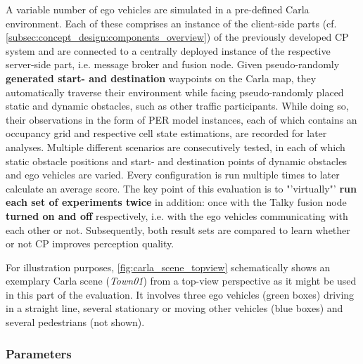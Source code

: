 A variable number of ego vehicles are simulated in a pre-defined Carla environment. Each of these comprises an instance of the client-side parts (cf. \cref{subsec:concept_design:components_overview}) of the previously developed CP system and are connected to a centrally deployed instance of the respective server-side part, i.e. message broker and fusion node. Given pseudo-randomly \textbf{generated start- and destination} waypoints on the Carla map, they automatically traverse their environment while facing pseudo-randomly placed static and dynamic obstacles, such as other traffic participants. While doing so, their observations in the form of PER model instances, each of which contains an occupancy grid and respective cell state estimations, are recorded for later analyses. Multiple different scenarios are consecutively tested, in each of which static obstacle positions and start- and destination points of dynamic obstacles and ego vehicles are varied. Every configuration is run multiple times to later calculate an average score. The key point of this evaluation is to "'virtually"' \textbf{run each set of experiments twice} in addition: once with the Talky fusion node \textbf{turned on and off} respectively, i.e. with the ego vehicles communicating with each other or not. Subsequently, both result sets are compared to learn whether or not CP improves perception quality.

For illustration purposes, \cref{fig:carla_scene_topview} schematically shows an exemplary Carla scene (\textit{Town01}) from a top-view perspective as it might be used in this part of the evaluation. It involves three ego vehicles (green boxes) driving in a straight line, several stationary or moving other vehicles (blue boxes) and several pedestrians (not shown).
\par
\bigskip

\subsubsection{Parameters}

